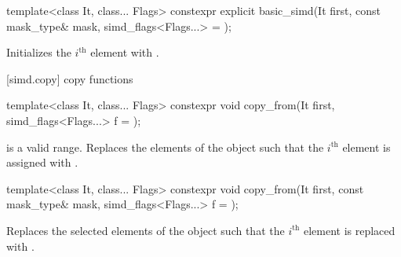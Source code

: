 \begin{itemdecl}
template<class It, class... Flags>
  constexpr explicit basic_simd(It first, const mask_type& mask, simd_flags<Flags...> = {});
\end{itemdecl}

\begin{itemdescr}
  \SimdLoadDescr
    {\validMaskedRange}
    {Initializes the $i^\text{th}$ element with 
    \foralli.}
\end{itemdescr}

[simd.copy]{ copy functions}

\begin{itemdecl}
template<class It, class... Flags>
  constexpr void copy_from(It first, simd_flags<Flags...> f = {});
\end{itemdecl}

\begin{itemdescr}
  \SimdLoadDescr
    { is a valid range.}
    {Replaces the elements of the  object such that the $i^\text{th}$ element is
    assigned with  \foralli.}
\end{itemdescr}

\begin{itemdecl}
template<class It, class... Flags>
  constexpr void copy_from(It first, const mask_type& mask, simd_flags<Flags...> f = {});
\end{itemdecl}

\begin{itemdescr}
  \SimdLoadDescr
    {\validMaskedRange}
    {Replaces the selected elements of the  object such that the $i^\text{th}$
    element is replaced with  \forallmaskedi.}
\end{itemdescr}

\newcommand\SimdStoreDescr[2]{
  \pnum\constraints
  \begin{itemize}
    \item \tcode{iter_value_t<Out>} is a vectorizable type, and
    \item \tcode{Out} models \tcode{contiguous_iterator}, and
    \item \tcode{Out} models \tcode{indirectly_writable<value_type>}.
  \end{itemize}

  \pnum\mandates
  \conversionFlagsMandate{value_type}{iter_value_t<Out>}

  \pnum\expects
  \begin{itemize}
    \item #1
    \flagsRequires{basic_simd, iter_value_t<Out>}{iter_value_t<Out>}
  \end{itemize}

  \pnum\effects #2
}

